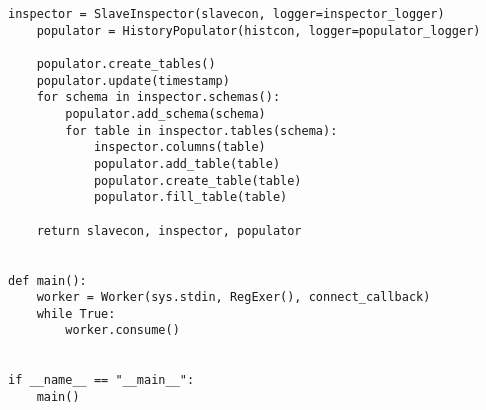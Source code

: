 \begin{lstlisting}[caption={history.py}]
    inspector = SlaveInspector(slavecon, logger=inspector_logger)
    populator = HistoryPopulator(histcon, logger=populator_logger)

    populator.create_tables()
    populator.update(timestamp)
    for schema in inspector.schemas():
        populator.add_schema(schema)
        for table in inspector.tables(schema):
            inspector.columns(table)
            populator.add_table(table)
            populator.create_table(table)
            populator.fill_table(table)

    return slavecon, inspector, populator


def main():
    worker = Worker(sys.stdin, RegExer(), connect_callback)
    while True:
        worker.consume()


if __name__ == "__main__":
    main()
\end{lstlisting}